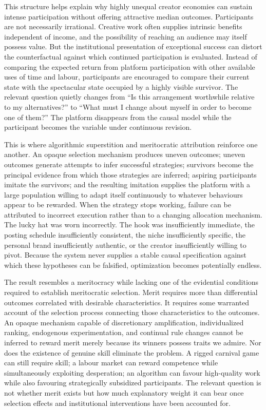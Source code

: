 \documentclass[11pt]{article}
\begin{document}
This structure helps explain why highly unequal creator economies can sustain intense participation without offering attractive median outcomes. Participants are not necessarily irrational. Creative work often supplies intrinsic benefits independent of income, and the possibility of reaching an audience may itself possess value. But the institutional presentation of exceptional success can distort the counterfactual against which continued participation is evaluated. Instead of comparing the expected return from platform participation with other available uses of time and labour, participants are encouraged to compare their current state with the spectacular state occupied by a highly visible survivor. The relevant question quietly changes from ``Is this arrangement worthwhile relative to my alternatives?'' to ``What must I change about myself in order to become one of them?'' The platform disappears from the causal model while the participant becomes the variable under continuous revision.

This is where algorithmic superstition and meritocratic attribution reinforce one another. An opaque selection mechanism produces uneven outcomes; uneven outcomes generate attempts to infer successful strategies; survivors become the principal evidence from which those strategies are inferred; aspiring participants imitate the survivors; and the resulting imitation supplies the platform with a large population willing to adapt itself continuously to whatever behaviours appear to be rewarded. When the strategy stops working, failure can be attributed to incorrect execution rather than to a changing allocation mechanism. The lucky hat was worn incorrectly. The hook was insufficiently immediate, the posting schedule insufficiently consistent, the niche insufficiently specific, the personal brand insufficiently authentic, or the creator insufficiently willing to pivot. Because the system never supplies a stable causal specification against which these hypotheses can be falsified, optimization becomes potentially endless.

The result resembles a meritocracy while lacking one of the evidential conditions required to establish meritocratic selection. Merit requires more than differential outcomes correlated with desirable characteristics. It requires some warranted account of the selection process connecting those characteristics to the outcomes. An opaque mechanism capable of discretionary amplification, individualized ranking, endogenous experimentation, and continual rule changes cannot be inferred to reward merit merely because its winners possess traits we admire. Nor does the existence of genuine skill eliminate the problem. A rigged carnival game can still require skill; a labour market can reward competence while simultaneously exploiting desperation; an algorithm can favour high-quality work while also favouring strategically subsidized participants. The relevant question is not whether merit exists but how much explanatory weight it can bear once selection effects and institutional interventions have been accounted for.
\end{document}

